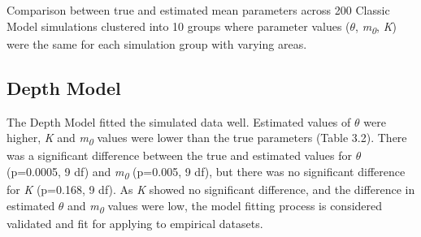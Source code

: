 {\begin{table}[h!]
  \begin{center}
    \caption{Comparison between true and estimated mean parameters across 200 Classic Model simulations clustered into 10 groups where parameter values ($\theta$, \textit{m\textsubscript{0}}, \textit{K}) were the same for each simulation group with varying areas.}
    \label{table5}
  \end{center}
\end{table}



\subsection{Depth Model}

\noindent The Depth Model fitted the simulated data well. Estimated values of $\theta$ were higher, \textit{K} and \textit{m\textsubscript{0}} values were lower than the true parameters (Table 3.2). There was a significant difference between the true and estimated values for $\theta$ (p=0.0005, 9 df) and \textit{m\textsubscript{0}} (p=0.005, 9 df), but there was no significant difference for \textit{K} (p=0.168, 9 df). As \textit{K} showed no significant difference, and the difference in estimated $\theta$ and \textit{m\textsubscript{0}} values were low, the model fitting process is considered validated and fit for applying to empirical datasets.  

}
